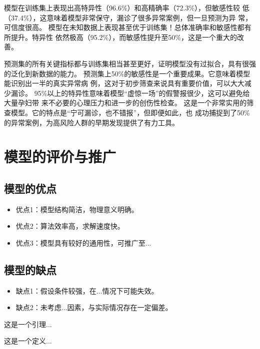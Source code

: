 \documentclass[withoutpreface,notoc]{cumcmthesis}
\begin{document}
	模型在训练集上表现出高特异性（96.6\%）和高精确率（72.3\%），但敏感性较
	低（37.4\%），这意味着模型非常保守，漏诊了很多异常案例，但一旦预测为异
	常，可信度很高。
	模型在未知数据上表现甚至优于训练集！总体准确率和敏感性都有所提升。特异性
	依然极高（95.2\%），而敏感性提升至50\%，这是一个重大的改善。

	预测集的所有关键指标都与训练集相当甚至更好，证明模型没有过拟合，具有很强
	的泛化到新数据的能力。
	预测集上50\%的敏感性是一个重要成果。它意味着模型能识别出一半的真实异常病
	例，这对于初步筛查来说具有重要价值，可以大大减少漏诊。
	95\%以上的特异性意味着模型“虚惊一场”的假警报很少，这可以避免给大量孕妇带
	来不必要的心理压力和进一步的创伤性检查。
	这是一个非常实用的筛查模型。它的特点是“宁可漏诊，也不错报”，但即便如此，也
	成功捕捉到了50\%的异常案例，为高风险人群的早期发现提供了有力工具。








	

	\section{模型的评价与推广}
	\subsection{模型的优点}
	\begin{itemize}[itemindent=2em]
		\item 优点1：模型结构简洁，物理意义明确。
		\item 优点2：算法效率高，求解速度快。
		\item 优点3：模型具有较好的通用性，可推广至...
	\end{itemize}
	\subsection{模型的缺点}
	\begin{itemize}[itemindent=2em]
		\item 缺点1：假设条件较强，在...情况下可能失效。
		\item 缺点2：未考虑...因素，与实际情况存在一定偏差。
	\end{itemize}



	\begin{lemma}
		这是一个引理...
	\end{lemma}
	\begin{definition}
		这是一个定义...
	\end{definition}
	
\end{document}
